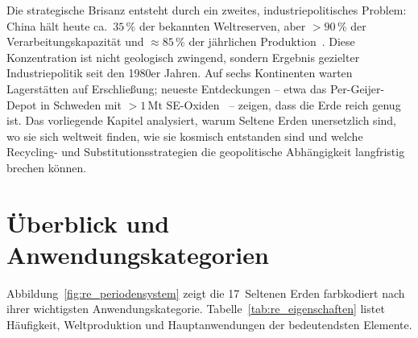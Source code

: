 ﻿\documentclass[12pt, a4paper]{report}
\theoremstyle{definition}
\theoremstyle{remark}
\begin{document}
Die strategische Brisanz entsteht durch ein zweites, industriepolitisches
Problem: China hält heute ca.~$35\,\%$ der bekannten Weltreserven, aber
$>90\,\%$ der Verarbeitungskapazität und $\approx 85\,\%$ der jährlichen
Produktion~\cite{massari2013}. Diese Konzentration ist nicht geologisch
zwingend, sondern Ergebnis gezielter Industriepolitik seit den 1980er Jahren.
Auf sechs Kontinenten warten Lagerstätten auf Erschließung; neueste
Entdeckungen -- etwa das Per-Geijer-Depot in Schweden mit $>1\,\text{Mt}$
SE-Oxiden~\cite{lkab2023} -- zeigen, dass die Erde reich genug ist. Das
vorliegende Kapitel analysiert, warum Seltene Erden unersetzlich sind, wo
sie sich weltweit finden, wie sie kosmisch entstanden sind und welche
Recycling- und Substitutionsstrategien die geopolitische Abhängigkeit
langfristig brechen können.

\section{Überblick und Anwendungskategorien}
\label{ssec:re_uebersicht}

\noindent Abbildung~\ref{fig:re_periodensystem} zeigt die 17~Seltenen
Erden farbkodiert nach ihrer wichtigsten Anwendungskategorie.
Tabelle~\ref{tab:re_eigenschaften} listet Häufigkeit, Weltproduktion und
Hauptanwendungen der bedeutendsten Elemente.
\end{document}
